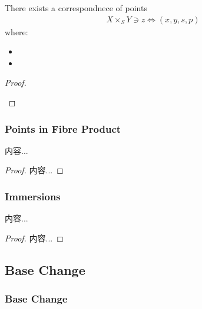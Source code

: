 \documentclass[Total.tex]{subfiles}
\begin{document}
					\begin{proposition}
						There exists a correspondnece of points
						\begin{gather*}
							X\times_S Y\ni z\Leftrightarrow (x,y,s,p)
						\end{gather*}
						where:
						\begin{itemize}
							\item 
							\item 
						\end{itemize}
					\end{proposition}
					\begin{proof}
						\begin{center}
						\end{center}
					\end{proof}
				\subsubsection{Points in Fibre Product}
					\begin{proposition}
						内容...
					\end{proposition}
					\begin{proof}
						内容...
					\end{proof}
				\subsubsection{Immersions}
					\begin{lemma}
						内容...
					\end{lemma}
					\begin{proof}
						内容...
					\end{proof}
			\subsection{Base Change}
				\subsubsection{Base Change}
			
\end{document}
